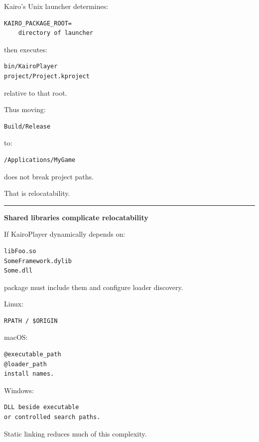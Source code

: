 Kairo's Unix launcher determines:

\begin{verbatim}
KAIRO_PACKAGE_ROOT=
    directory of launcher
\end{verbatim}

then executes:

\begin{verbatim}
bin/KairoPlayer
project/Project.kproject
\end{verbatim}

relative to that root.

Thus moving:

\begin{verbatim}
Build/Release
\end{verbatim}

to:

\begin{verbatim}
/Applications/MyGame
\end{verbatim}

does not break project paths.

That is relocatability.

\begin{center}\rule{0.5\linewidth}{0.5pt}\end{center}

\textbf{Shared libraries complicate relocatability}

If KairoPlayer dynamically depends on:

\begin{verbatim}
libFoo.so
SomeFramework.dylib
Some.dll
\end{verbatim}

package must include them and configure loader discovery.

Linux:

\begin{verbatim}
RPATH / $ORIGIN
\end{verbatim}

macOS:

\begin{verbatim}
@executable_path
@loader_path
install names.
\end{verbatim}

Windows:

\begin{verbatim}
DLL beside executable
or controlled search paths.
\end{verbatim}

Static linking reduces much of this complexity.


